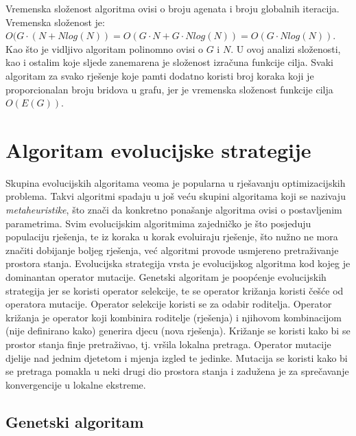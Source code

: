 \documentclass[times, utf8, diplomski, numeric]{fer}
\begin{document}
Vremenska složenost algoritma ovisi o broju agenata i broju globalnih iteracija. Vremenska složenost je: $O(G\cdot(N+Nlog(N))=O(G\cdot N+G\cdot Nlog(N))=O(G\cdot Nlog(N))$. Kao što je vidljivo algoritam polinomno ovisi o $G$ i $N$. U ovoj analizi složenosti, kao i ostalim koje sljede zanemarena je složenost izračuna funkcije cilja. Svaki algoritam za svako rješenje koje pamti dodatno koristi broj koraka koji je proporcionalan broju bridova u grafu, jer je vremenska složenost funkcije cilja $O(E(G))$. 

\section{Algoritam evolucijske strategije}

Skupina evolucijskih algoritama veoma je popularna u rješavanju optimizacijskih problema. Takvi algoritmi spadaju u još veću skupini algoritama koji se nazivaju \emph{metaheuristike}, što znači da konkretno ponašanje algoritma ovisi o postavljenim parametrima. Svim evolucijskim algoritmima zajedničko je što posjeduju populaciju rješenja, te iz koraka u korak evoluiraju rješenje, što nužno ne mora značiti dobijanje boljeg rješenja, već algoritmi provode usmjereno pretraživanje prostora stanja. Evolucijska strategija vrsta je evolucijskog algoritma kod kojeg je dominantan operator mutacije. Genetski algoritam je poopćenje evolucijskih strategija jer se koristi operator selekcije, te se operator križanja koristi češće od operatora mutacije. Operator selekcije koristi se za odabir roditelja. Operator križanja je operator koji kombinira roditelje (rješenja) i njihovom kombinacijom (nije definirano kako) generira djecu (nova rješenja). Križanje se koristi kako bi se prostor stanja finje pretraživao, tj. vršila lokalna pretraga. Operator mutacije djelije nad jednim djetetom i mjenja izgled te jedinke. Mutacija se koristi kako bi se pretraga pomakla u neki drugi dio prostora stanja i zadužena je za sprečavanje konvergencije u lokalne ekstreme. 

\subsection{Genetski algoritam}
\end{document}
